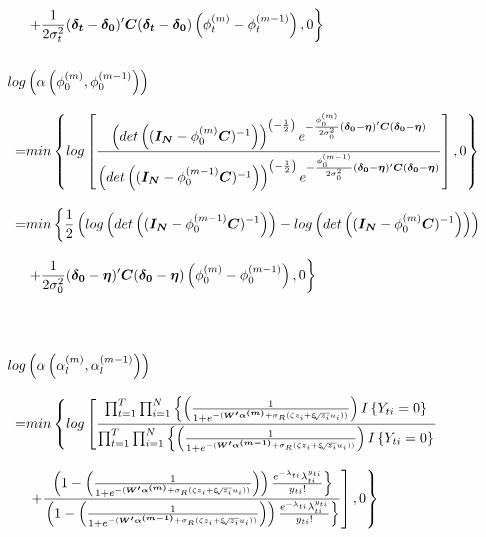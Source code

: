 \documentclass[12pt,a4paper]{article}
\begin{document}
\begin{CJK}{UTF8}{bkai}
\begin{align*}
& \left. +\frac{1}{2\sigma_t^2}(\bm{\delta_t}-\bm{\delta_0})^\prime \bm{C}(\bm{\delta_t}-\bm{\delta_0})\left(\phi_t^{(m)}-\phi_t^{(m-1)}\right),0\right\}
\\ \hspace*{\fill} \\
 log & \left(\alpha\left(\phi_0^{(m)},\phi_0^{(m-1)}\right)\right) \\[3mm]
 = &
min\left\{log\left[\frac{ \left(det\left((\bm{I_N}-\phi_0^{(m)}\bm{C})^{-1}\right)\right)^{\left(-\frac{1}{2}\right)} e^{-\frac{\phi_0^{(m)}}{2\sigma_0^2}(\bm{\delta_0}-\bm{\eta})^\prime \bm{C}(\bm{\delta_0}-\bm{\eta})} }{ \left(det\left((\bm{I_N}-\phi_0^{(m-1)}\bm{C})^{-1}\right)\right)^{\left(-\frac{1}{2}\right)} e^{-\frac{\phi_0^{(m-1)}}{2\sigma_0^2}(\bm{\delta_0}-\bm{\eta})^\prime \bm{C}(\bm{\delta_0}-\bm{\eta})} }\right],0\right\}\\[3mm]
 = &
min\left\{\frac{1}{2}\left(log\left(det\left((\bm{I_N}-\phi_0^{(m-1)}\bm{C})^{-1}\right)\right)-log\left(det\left((\bm{I_N}-\phi_0^{(m)}\bm{C})^{-1}\right)\right)\right)\right. \\[3mm]
& \left. +\frac{1}{2\sigma_0^2}(\bm{\delta_0}-\bm{\eta})^\prime \bm{C}(\bm{\delta_0}-\bm{\eta})\left(\phi_0^{(m)}-\phi_0^{(m-1)}\right),0\right\}\\[3mm]
 \\ \hspace*{\fill} \\
 log & \left(\alpha\left(\alpha_l^{(m)},\alpha_l^{(m-1)}\right)\right) \\[3mm]
 = &
 min\left\{log\left[\frac{\prod_{t=1}^T\prod_{i=1}^N \left\{ \left( \frac{1}{1+e^{-(\bm{W^\prime}\bm{\alpha^{(m)}}+\sigma_R(\zeta z_i+\xi \sqrt[]{z_i} u_i))}} \right)I\left\{ Y_{ti} = 0\right\}\right.}{\prod_{t=1}^T\prod_{i=1}^N \left\{ \left( \frac{1}{1+e^{-(\bm{W^\prime}\bm{\alpha^{(m-1)}}+\sigma_R(\zeta z_i+\xi \sqrt[]{z_i} u_i))}} \right)I\left\{ Y_{ti} = 0\right\}\right.}\right.\right. \\[3mm]
 & \left.\left. +\frac{\left.\left(1-\left( \frac{1}{1+e^{-(\bm{W^\prime}\bm{\alpha^{(m)}}+\sigma_R(\zeta z_i+\xi \sqrt[]{z_i} u_i))}} \right)\right)\frac{e^{-\lambda_{ti}}\lambda_{ti}^{y_{ti}}}{y_{ti}!}\right\}}{\left.\left(1-\left( \frac{1}{1+e^{-(\bm{W^\prime}\bm{\alpha^{(m-1)}}+\sigma_R(\zeta z_i+\xi \sqrt[]{z_i} u_i))}} \right)\right)\frac{e^{-\lambda_{ti}}\lambda_{ti}^{y_{ti}}}{y_{ti}!}\right\}}\right],0\right\} \\[3mm]

\end{align*}
\end{CJK}
\end{document}
